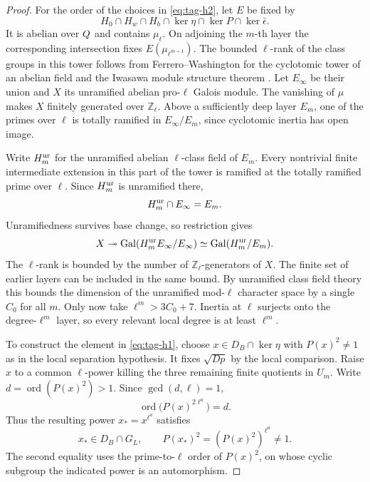 \begin{proof}
For the order of the choices in \eqref{eq:tag-h2}, let \(E\) be fixed by
\[
       H_0\cap H_w\cap H_b\cap\ker\eta\cap\ker P
                    \cap\ker\bar\epsilon .
\]
It is abelian over \(Q\) and contains \(\mu_\ell\). On adjoining
the \(m\)-th layer the corresponding intersection fixes
\(E(\mu_{\ell^{m+1}})\). The bounded \(\ell\)-rank of the class
groups in this tower follows from Ferrero--Washington for the
cyclotomic tower of an abelian field and the Iwasawa module
structure theorem \cite[Chapter~13]{washington-cyclo}. Let \(E_\infty\) be their union and \(X\) its unramified abelian pro-\(\ell\) Galois module. The vanishing of \(\mu\) makes \(X\) finitely generated
over \(\mathbb Z_\ell\). Above a sufficiently deep layer \(E_m\),
one of the primes over \(\ell\) is totally ramified in
\(E_\infty/E_m\), since cyclotomic inertia has open image.

Write \(H_m^{\rm ur}\) for the unramified abelian
\(\ell\)-class field of \(E_m\). Every nontrivial finite intermediate extension in this part of the tower is ramified at the totally ramified prime over \(\ell\). Since \(H_m^{\rm ur}\) is unramified there,
\[
 H_m^{\rm ur}\cap E_\infty=E_m .
\] Unramifiedness survives base
change, so restriction gives
\[
 X\twoheadrightarrow\operatorname{Gal}
            (H_m^{\rm ur}E_\infty/E_\infty)
      \simeq\operatorname{Gal}(H_m^{\rm ur}/E_m).
\]
The \(\ell\)-rank is bounded by the number of
\(\mathbb Z_\ell\)-generators of \(X\). The finite
set of earlier layers can be included in the same bound.
By unramified class field theory this bounds
the dimension of the unramified mod-\(\ell\) character space by
a single \(C_0\) for all \(m\). Only now take
\(\ell^m>3C_0+7\). Inertia at \(\ell\) surjects onto the
degree-\(\ell^m\) layer, so every relevant local degree is at
least \(\ell^m\).

To construct the element in \eqref{eq:tag-h1}, choose \(x\in D_B\cap\ker\eta\) with \(P(x)^2\ne1\) as in the local separation hypothesis.
It fixes \(\sqrt{Dp}\) by the local comparison. Raise \(x\)
to a common \(\ell\)-power killing the three remaining finite
quotients in \(U_m\). Write \(d=\operatorname{ord}(P(x)^2)>1\). Since \(\gcd(d,\ell)=1\),
\[
 \operatorname{ord}\bigl(P(x)^{2\ell^a}\bigr)=d.
\]
Thus the resulting power \(x_*=x^{\ell^a}\) satisfies
\[
 x_*\in D_B\cap G_L,\qquad
 P(x_*)^2=(P(x)^2)^{\ell^a}\ne1 .
\]
The second equality uses the prime-to-\(\ell\) order of \(P(x)^2\),
on whose cyclic subgroup the indicated power is an automorphism.


\end{proof}
